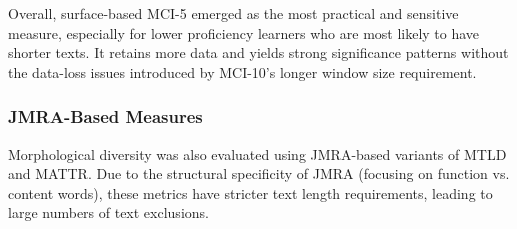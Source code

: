 Overall, surface-based MCI-5 emerged as the most practical and sensitive measure, especially for lower proficiency
learners who are most likely to have shorter texts. It retains more data and yields strong significance patterns
without the data-loss issues introduced by MCI-10's longer window size requirement.

\subsubsection{JMRA-Based Measures}

Morphological diversity was also evaluated using JMRA-based variants of MTLD and MATTR. Due to the structural
specificity of JMRA (focusing on function vs. content words), these metrics have stricter text length requirements,
leading to large numbers of text exclusions.

